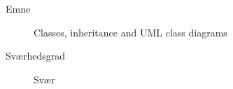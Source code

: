 \begin{description}
\item[Emne]  Classes, inheritance and UML class diagrams
\item[Sværhedsgrad] Svær
\end{description}
